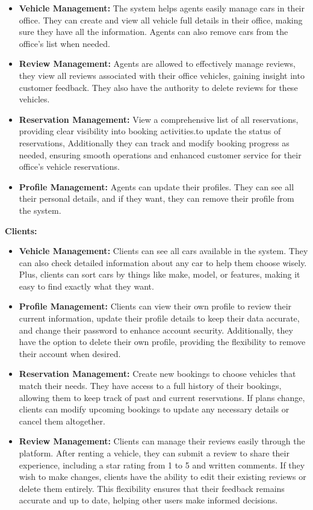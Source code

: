 \begin{itemize}
    \item \textbf{Vehicle Management:} The  system helps agents easily manage cars in their office. They can create and view all vehicle full details in their office, making sure they have all the information. Agents can also remove cars from the office's list when needed.
    
    \item \textbf{Review Management:} Agents are allowed to effectively manage reviews, they view all reviews associated with their office vehicles, gaining insight into customer feedback. They also have the authority to delete reviews for these vehicles.

\newpage
    \item \textbf{Reservation Management:} View a comprehensive list of all reservations, providing clear visibility into booking activities.to update the status of reservations, Additionally they can track and modify booking progress as needed, ensuring smooth operations and enhanced customer service for their office's vehicle reservations.
    \item \textbf{Profile Management:} Agents can update their profiles. They can see all their personal details, and if they want, they can remove their profile from the system.
\end{itemize}

\noindent\textbf{Clients:}
\begin{itemize}
    \item \textbf{Vehicle Management:} Clients can see all cars available in the system. They can also check detailed information about any car to help them choose wisely. Plus, clients can sort cars by things like make, model, or features, making it easy to find exactly what they want.
    
    \item \textbf{Profile Management:} Clients can view their own profile to review their current information, update their profile details to keep their data accurate, and change their password to enhance account security. Additionally, they have the option to delete their own profile, providing the flexibility to remove their account when desired.
    
    \item \textbf{Reservation Management:} Create new bookings to choose vehicles that match their needs. They have access to a full history of their bookings, allowing them to keep track of past and current reservations. If plans change, clients can modify upcoming bookings to update any necessary details or cancel them altogether.
    
    \item \textbf{Review Management:} Clients can manage their reviews easily through the platform. After renting a vehicle, they can submit a review to share their experience, including a star rating from 1 to 5 and written comments. If they wish to make changes, clients have the ability to edit their existing reviews or delete them entirely. This flexibility ensures that their feedback remains accurate and up to date, helping other users make informed decisions.
\end{itemize}

